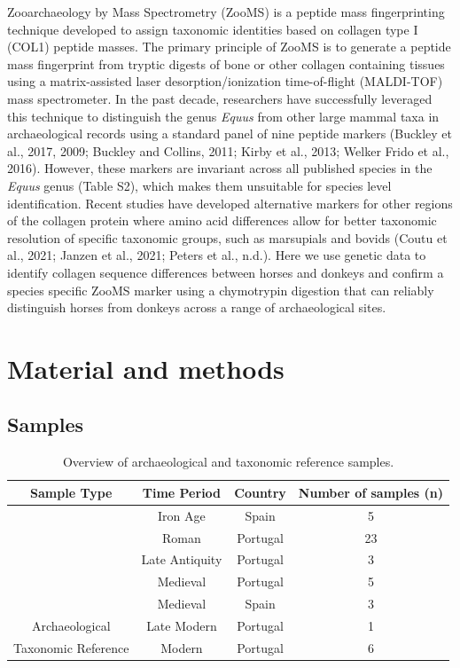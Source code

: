 \documentclass[preprint, 3p, authoryear]{elsarticle} %
\begin{document}
Zooarchaeology by Mass Spectrometry (ZooMS) is a peptide mass fingerprinting technique developed to assign taxonomic identities based on collagen type I (COL1) peptide masses. The primary principle of ZooMS is to generate a peptide mass fingerprint from tryptic digests of bone or other collagen containing tissues using a matrix-assisted laser desorption/ionization time-of-flight (MALDI-TOF) mass spectrometer. In the past decade, researchers have successfully leveraged this technique to distinguish the genus \emph{Equus} from other large mammal taxa in archaeological records using a standard panel of nine peptide markers (Buckley et al., 2017, 2009; Buckley and Collins, 2011; Kirby et al., 2013; Welker Frido et al., 2016). However, these markers are invariant across all published species in the \emph{Equus} genus (Table S2), which makes them unsuitable for species level identification. Recent studies have developed alternative markers for other regions of the collagen protein where amino acid differences allow for better taxonomic resolution of specific taxonomic groups, such as marsupials and bovids (Coutu et al., 2021; Janzen et al., 2021; Peters et al., n.d.). Here we use genetic data to identify collagen sequence differences between horses and donkeys and confirm a species specific ZooMS marker using a chymotrypin digestion that can reliably distinguish horses from donkeys across a range of archaeological sites.

\hypertarget{material-and-methods}{%
\section{Material and methods}\label{material-and-methods}}

\hypertarget{samples}{%
\subsection{Samples}\label{samples}}

\begin{table}[H]

\caption{\label{tab:eqtable1}Overview of archaeological and taxonomic reference samples.}
\centering
\begin{tabular}[t]{cccc}
\toprule
Sample Type & Time Period & Country & Number of samples (n)\\
\midrule
 & Iron Age & Spain & 5\\
\cmidrule{2-4}
 & Roman & Portugal & 23\\
\cmidrule{2-4}
 & Late Antiquity & Portugal & 3\\
\cmidrule{2-4}
 & Medieval & Portugal & 5\\
\cmidrule{2-4}
 & Medieval & Spain & 3\\
\cmidrule{2-4}
\multirow{-6}{*}{\centering\arraybackslash Archaeological} & Late Modern & Portugal & 1\\
\cmidrule{1-4}
Taxonomic Reference & Modern & Portugal & 6\\
\bottomrule
\end{tabular}
\end{table}
\end{document}
